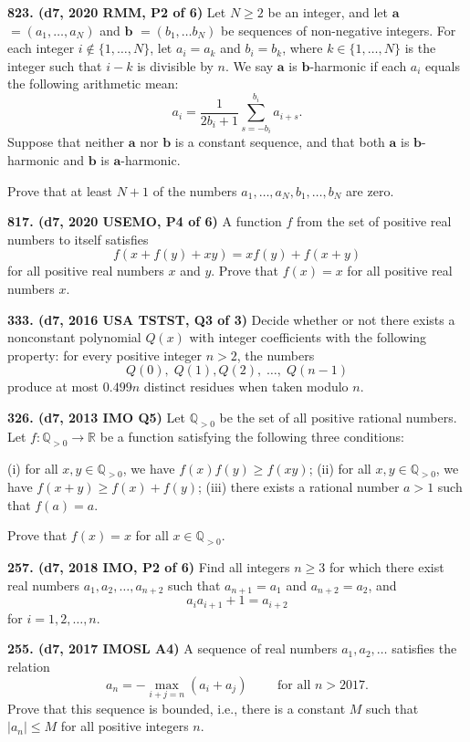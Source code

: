 \documentclass{article}
\begin{document}
\textbf{823. (\color{red}d7\color{black}, 2020 RMM, P2 of 6)} Let $N \geq 2$ be an integer, and let $\mathbf a$ $= (a_1, \ldots, a_N)$ and $\mathbf b$ $= (b_1, \ldots b_N)$ be sequences of non-negative integers. For each integer $i \not \in \{1, \ldots, N\}$, let $a_i = a_k$ and $b_i = b_k$, where $k \in \{1, \ldots, N\}$ is the integer such that $i-k$ is divisible by $n$. We say $\mathbf a$ is $\mathbf b$-harmonic if each $a_i$ equals the following arithmetic mean:\[a_i = \frac{1}{2b_i+1} \sum_{s=-b_i}^{b_i} a_{i+s}.\]Suppose that neither $\mathbf a $ nor $\mathbf b$ is a constant sequence, and that both $\mathbf a$ is $\mathbf b$-harmonic and $\mathbf b$ is $\mathbf a$-harmonic.

Prove that at least $N+1$ of the numbers $a_1, \ldots, a_N,b_1, \ldots, b_N$ are zero.

\textbf{817. (\color{red}d7\color{black}, 2020 USEMO, P4 of 6)} A function $f$ from the set of positive real numbers to itself satisfies $$f(x + f(y) + xy) = xf(y) + f(x + y)$$for all positive real numbers $x$ and $y$. Prove that $f(x) = x$ for all positive real numbers $x$.

\textbf{333. (\color{red}d7\color{black}, 2016 USA TSTST, Q3 of 3)} Decide whether or not there exists a nonconstant polynomial $Q(x)$ with integer coefficients with the following property: for every positive integer $n > 2$, the numbers\[ Q(0), \; Q(1), Q(2),  \; \dots, \; Q(n-1) \]produce at most $0.499n$ distinct residues when taken modulo $n$.

\textbf{326. (\color{red}d7\color{black}, 2013 IMO Q5)} Let $\mathbb Q_{>0}$ be the set of all positive rational numbers. Let $f:\mathbb Q_{>0}\to\mathbb R$ be a function satisfying the following three conditions:

(i) for all $x,y\in\mathbb Q_{>0}$, we have $f(x)f(y)\geq f(xy)$;
(ii) for all $x,y\in\mathbb Q_{>0}$, we have $f(x+y)\geq f(x)+f(y)$;
(iii) there exists a rational number $a>1$ such that $f(a)=a$.

Prove that $f(x)=x$ for all $x\in\mathbb Q_{>0}$.

\textbf{257. (\color{red}d7\color{black}, 2018 IMO, P2 of 6)} Find all integers \(n \geq 3\) for which there exist real numbers \(a_1, a_2, \dots, a_{n+2}\) such that \(a_{n+1} = a_1\) and \(a_{n+2} = a_2\), and \[a_ia_{i+1} + 1 = a_{i+2}\] for \(i = 1, 2, \dots, n\).

\textbf{255. (\color{red}d7\color{black}, 2017 IMOSL A4)} A sequence of real numbers \(a_1, a_2, \dots\) satisfies the relation \[a_n = - \max_{i+j=n} ( a_i + a_j ) \qquad \text{ for all } n > 2017.\]Prove that this sequence is bounded, i.e., there is a constant \(M\) such that \(  \lvert a_n  \rvert \leq M\) for all positive integers \(n\).
\end{document}
